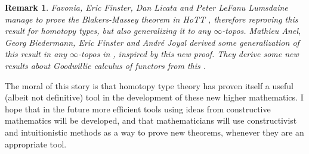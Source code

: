 \documentclass{article}
\newtheorem{remark}{Remark}
\begin{document}
\begin{remark}
Favonia, Eric Finster, Dan Licata and Peter LeFanu Lumsdaine manage to prove the Blakers-Massey theorem in HoTT \cite{hou2016mechanization}, therefore reproving this result for homotopy types, but also generalizing it to any $\infty$-topos. Mathieu Anel, Georg Biedermann, Eric Finster and Andr{\'e} Joyal derived some generalization of this result in any $\infty$-topos in \cite{anel2017generalized}, inspired by this new proof. They derive some new results about Goodwillie calculus of functors from this \cite{anel2018goodwillie}. 
\end{remark}

The moral of this story is that homotopy type theory has proven itself a useful (albeit not definitive) tool in the development of these new higher mathematics. I hope that in the future more efficient tools using ideas from constructive mathematics will be developed, and that mathematicians will use constructivist and intuitionistic methods as a way to prove new theorems, whenever they are an appropriate tool.



\end{document}
